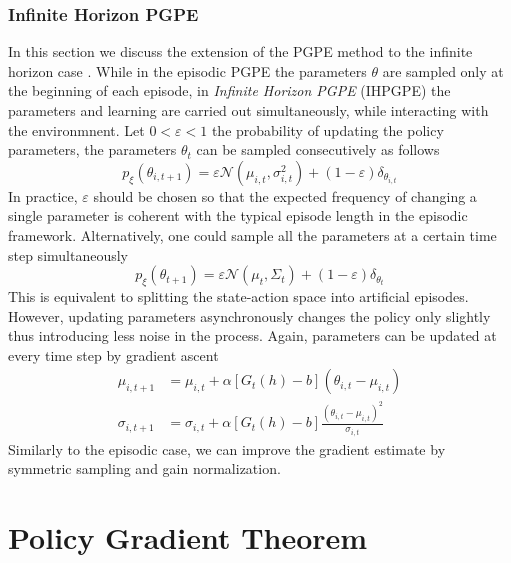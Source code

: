\subsubsection{Infinite Horizon PGPE}
In this section we discuss the extension of the PGPE method to the infinite
horizon case \cite{sehnke2012parameter}. While in the episodic PGPE the
parameters $\theta$ are sampled only at the beginning of each episode, in
\emph{Infinite Horizon PGPE} (IHPGPE) the parameters and learning are carried 
out simultaneously, while interacting with the environmnent. Let $0 <
\varepsilon < 1$ the probability of updating the policy parameters, the 
parameters $\theta_t$ can be sampled consecutively as follows
\begin{equation}
	p_\xi(\theta_{i,t+1}) = \varepsilon \mathcal{N}(\mu_{i,t}, \sigma_{i,t}^2) 
							+ (1-\varepsilon) \delta_{\theta_{i,t}}
\end{equation}
In practice, $\varepsilon$ should be chosen so that the expected frequency of
changing a single parameter is coherent with the typical episode length in the
episodic framework. Alternatively, one could sample all the parameters at a
certain time step simultaneously
\begin{equation}
	p_\xi(\theta_{t+1}) = \varepsilon \mathcal{N}(\mu_{t}, \Sigma_t) 
							+ (1-\varepsilon) \delta_{\theta_{t}}
\end{equation}
This is equivalent to splitting the state-action space into artificial
episodes. However, updating parameters asynchronously changes the policy only
slightly thus introducing less noise in the process. Again, parameters can be
updated at every time step by gradient ascent
\begin{equation}
	\begin{split}
		\mu_{i,t+1} &= \mu_{i,t} + \alpha \left[G_t(h) - b\right] (\theta_{i,t}
		- \mu_{i,t})\\
		\sigma_{i,t+1} &= \sigma_{i,t} + \alpha \left[G_t(h) - b\right] 
		\frac{(\theta_{i,t} -\mu_{i,t})^2}{\sigma_{i,t}}
	\end{split}
\end{equation}
Similarly to the episodic case, we can improve the gradient estimate by
symmetric sampling and gain normalization. 


\section{Policy Gradient Theorem}

